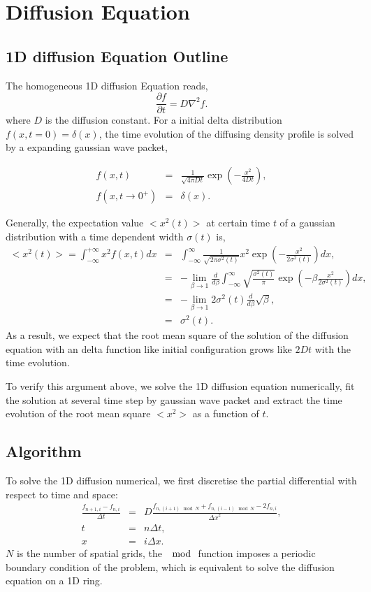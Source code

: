 \documentclass[a4paper,12pt]{article}
\begin{document}
\section{Diffusion Equation}
\subsection{1D diffusion Equation Outline}
\indent
\indent The homogeneous 1D diffusion Equation reads,
\begin{equation}
	\frac{\partial f}{\partial t} = D \nabla^2 f.
\end{equation}
where $D$ is the diffusion constant. For a initial delta distribution $f(x, t = 0) = \delta(x)$, the time evolution of the diffusing density profile is solved by a expanding gaussian wave packet,

\begin{eqnarray*}
	f(x,t) &=& \frac{1}{\sqrt{4\pi D t}} \exp{(-\frac{x^2}{4Dt})}, \\
	f(x, t \rightarrow 0^+) &=& \delta(x).
\end{eqnarray*}

Generally, the expectation value $<x^2(t)>$ at certain time $t$ of a gaussian distribution with a time dependent width $\sigma(t)$ is,
\begin{eqnarray*}
	<x^2(t)> = \int_{-\infty}^{+\infty} x^2 f(x,t) dx &=&  \int_{-\infty}^{\infty}  \frac{1}{\sqrt{2\pi \sigma^2(t)}} x^2 \exp{(-\frac{x^2}{2\sigma^2(t)})} dx, \\
	& = & -\lim_{\beta\rightarrow 1}\frac{d}{d\beta}\int_{-\infty}^{\infty}  \sqrt{\frac{\sigma^2(t)}{\pi}} \exp{(-\beta \frac{x^2}{2\sigma^2(t)})} dx, \\
	& = & -\lim_{\beta\rightarrow 1} 2\sigma^2(t)\frac{d}{d\beta}\sqrt{\beta}, \\
	& = & \sigma^2(t). 
\end{eqnarray*}
As a result, we expect that the root mean square of the solution of the diffusion equation with an delta function like initial configuration grows like $2Dt$ with the time evolution. 

To verify this argument above, we solve the 1D diffusion equation numerically, fit the solution at several time step by gaussian wave packet and extract the time evolution of the root mean square $<x^2>$ as a function of $t$.

\subsection{Algorithm}
To solve the 1D diffusion numerical, we first discretise the partial differential with respect to time and space:
\begin{eqnarray*}
\frac{f_{n+1,i}-f_{n,i}}{\Delta t}  &=& D\frac{f_{n,(i+1)\mod N}+f_{n,(i-1)\mod N} - 2 f_{n,i}}{{\Delta x}^2},\\
t &=& n \Delta t, \\
x &=& i \Delta x.
\end{eqnarray*}
$N$ is the number of spatial grids, the $\mod$ function imposes a periodic boundary condition of the problem, which is equivalent to solve the diffusion equation on a 1D ring.
\end{document}
